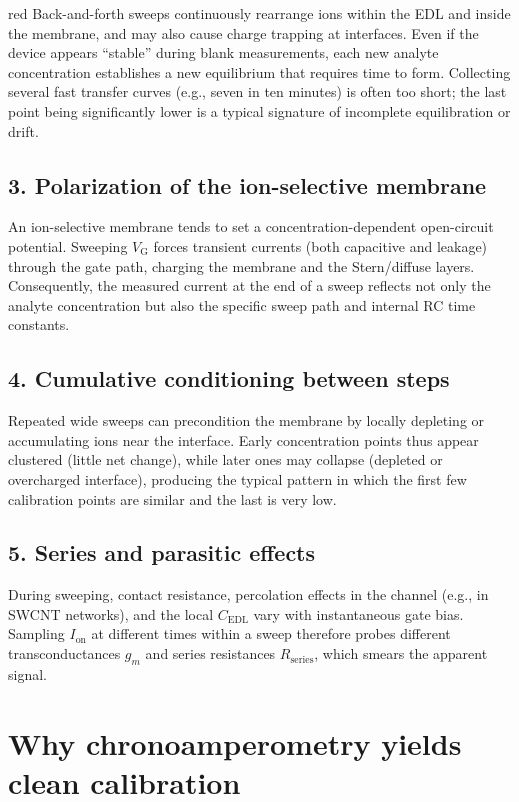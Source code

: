 \begin{color}{red}
Back-and-forth sweeps continuously rearrange ions within the EDL and inside the membrane, and may also cause charge trapping at interfaces.
Even if the device appears ``stable'' during blank measurements, each new analyte concentration establishes a new equilibrium that requires time to form.
Collecting several fast transfer curves (e.g., seven in ten minutes) is often too short; 
the last point being significantly lower is a typical signature of incomplete equilibration or drift.

\subsection*{3. Polarization of the ion-selective membrane}

An ion-selective membrane tends to set a concentration-dependent open-circuit potential.
Sweeping $V_{\mathrm{G}}$ forces transient currents (both capacitive and leakage) through the gate path, charging the membrane and the Stern/diffuse layers.
Consequently, the measured current at the end of a sweep reflects not only the analyte concentration but also the specific sweep path and internal RC time constants.

\subsection*{4. Cumulative conditioning between steps}

Repeated wide sweeps can precondition the membrane by locally depleting or accumulating ions near the interface.
Early concentration points thus appear clustered (little net change), while later ones may collapse (depleted or overcharged interface), 
producing the typical pattern in which the first few calibration points are similar and the last is very low.

\subsection*{5. Series and parasitic effects}

During sweeping, contact resistance, percolation effects in the channel (e.g., in SWCNT networks), and the local $C_{\mathrm{EDL}}$ vary with instantaneous gate bias.
Sampling $I_{\mathrm{on}}$ at different times within a sweep therefore probes different transconductances $g_m$ and series resistances $R_{\mathrm{series}}$, which smears the apparent signal.

\section*{Why chronoamperometry yields clean calibration}


\end{color}
